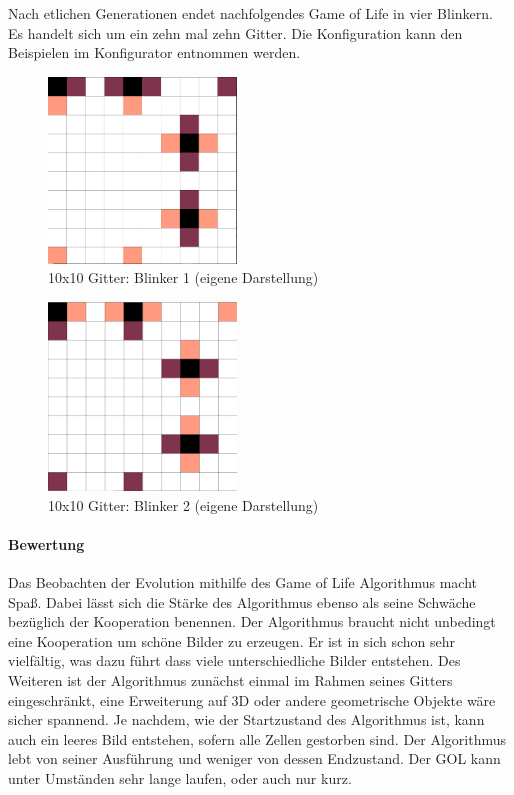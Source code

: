 \documentclass[../mciAusarbeitung.tex]{subfiles}
\begin{document}
Nach etlichen Generationen endet nachfolgendes Game of Life in vier Blinkern. Es handelt sich um ein zehn mal zehn Gitter. Die Konfiguration kann den Beispielen im Konfigurator entnommen werden.

\begin{figure}[H]
\includegraphics[width=5cm]{img/10x10_blinker_seed10000.png}
\caption{10x10 Gitter: Blinker 1 (eigene Darstellung)}
\label{10x10_blinker_seed10000}
\end{figure}

\begin{figure}[H]
\includegraphics[width=5cm]{img/other_10x10_blinker_seed10000.png}
\caption{10x10 Gitter: Blinker 2 (eigene Darstellung)}
\label{other_10x10_blinker_seed10000}
\end{figure}

\paragraph{Bewertung}
Das Beobachten der Evolution mithilfe des Game of Life Algorithmus macht Spaß. Dabei lässt sich die Stärke des Algorithmus ebenso als seine Schwäche bezüglich der Kooperation benennen. Der Algorithmus braucht nicht unbedingt eine Kooperation um schöne Bilder zu erzeugen. Er ist in sich schon sehr vielfältig, was dazu führt dass viele unterschiedliche Bilder entstehen. Des Weiteren ist der Algorithmus zunächst einmal im Rahmen seines Gitters eingeschränkt, eine Erweiterung auf 3D oder andere geometrische Objekte wäre sicher spannend. Je nachdem, wie der Startzustand des Algorithmus ist, kann auch ein leeres Bild entstehen, sofern alle Zellen gestorben sind. Der Algorithmus lebt von seiner Ausführung und weniger von dessen Endzustand. Der GOL kann unter Umständen sehr lange laufen, oder auch nur kurz. 
\end{document}
